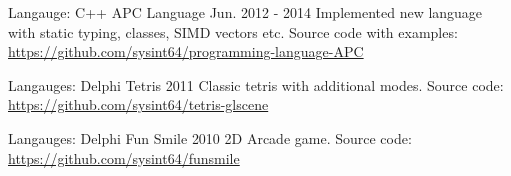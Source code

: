 \begin{cventries}
\cventry
{Langauge: C++} %
{APC Language} %
{} %
{Jun. 2012 - 2014} %
{ %
Implemented new language with static typing, classes, SIMD vectors etc. \linebreak
Source code with examples: \url{https://github.com/sysint64/programming-language-APC}
}


\cventry
{Langauges: Delphi} %
{Tetris} %
{} %
{2011} %
{ %
Classic tetris with additional modes. Source code: \url{https://github.com/sysint64/tetris-glscene}
}

\cventry
{Langauges: Delphi} %
{Fun Smile} %
{} %
{2010} %
{ %
2D Arcade game. Source code: \url{https://github.com/sysint64/funsmile}
}


\end{cventries}
